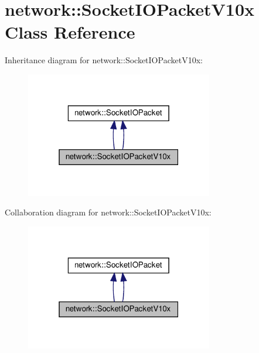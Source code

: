 \hypertarget{classnetwork_1_1SocketIOPacketV10x}{}\section{network\+:\+:Socket\+I\+O\+Packet\+V10x Class Reference}
\label{classnetwork_1_1SocketIOPacketV10x}


Inheritance diagram for network\+:\+:Socket\+I\+O\+Packet\+V10x\+:
\nopagebreak
\begin{figure}[H]
\begin{center}
\leavevmode
\includegraphics[width=232pt]{classnetwork_1_1SocketIOPacketV10x__inherit__graph}
\end{center}
\end{figure}


Collaboration diagram for network\+:\+:Socket\+I\+O\+Packet\+V10x\+:
\nopagebreak
\begin{figure}[H]
\begin{center}
\leavevmode
\includegraphics[width=232pt]{classnetwork_1_1SocketIOPacketV10x__coll__graph}
\end{center}
\end{figure}
